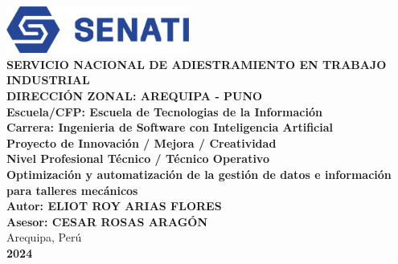 \documentclass[stu, 12pt, letterpaper, donotrepeattitle, floatsintext, natbib]{apa7}
\begin{document}
\begin{titlepage}
	\begin{center}
		\includegraphics[width=6cm]{imagenes/senati.png}\\
		\vspace*{0.5cm}
		\textbf{SERVICIO NACIONAL DE ADIESTRAMIENTO EN TRABAJO INDUSTRIAL}\\
		\vspace*{1.5cm}
		\textbf{DIRECCIÓN ZONAL: AREQUIPA - PUNO}\\
		\textbf{Escuela/CFP: Escuela de Tecnologias de la Información}\\
		\textbf{Carrera: Ingenieria de Software con Inteligencia Artificial}\\
		\vspace*{1.8cm}
		\textbf{Proyecto de Innovación / Mejora / Creatividad\\Nivel Profesional Técnico / Técnico Operativo}\\
		\vspace*{1.7cm}
		\textbf{\LARGE Optimización y automatización de la gestión de datos e información para talleres mecánicos}\\
		\vspace*{1cm}
		\textbf{Autor:    ELIOT ROY ARIAS FLORES}\\
		\textbf{Asesor:    CESAR ROSAS ARAGÓN}\\
		\vspace*{1.5cm}
		Arequipa, Perú\\
		\textbf{2024}

	\end{center}

\end{titlepage}


\justifying
\setlength{\parindent}{1.27cm}


\emergencystretch=5pt
\end{document}

